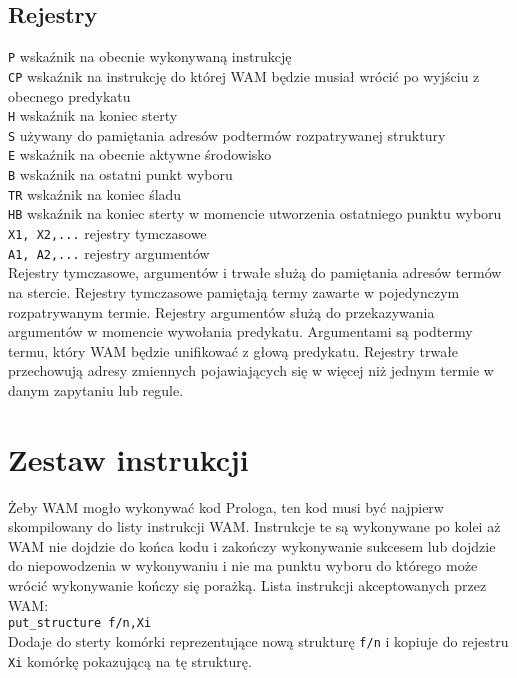 \subsection{Rejestry}
\texttt{P} wskaźnik na obecnie wykonywaną instrukcję\\
\texttt{CP} wskaźnik na instrukcję do której WAM będzie musiał wrócić po wyjściu z obecnego predykatu\\
\texttt{H} wskaźnik na koniec sterty\\
\texttt{S} używany do pamiętania adresów podtermów rozpatrywanej struktury\\
\texttt{E} wskaźnik na obecnie aktywne środowisko\\
\texttt{B} wskaźnik na ostatni punkt wyboru\\
\texttt{TR} wskaźnik na koniec śladu\\
\texttt{HB} wskaźnik na koniec sterty w momencie utworzenia ostatniego punktu wyboru\\
\texttt{X1, X2,...} rejestry tymczasowe\\
\texttt{A1, A2,...} rejestry argumentów\\

Rejestry tymczasowe, argumentów i trwałe służą do pamiętania adresów termów na stercie. Rejestry tymczasowe pamiętają termy zawarte w pojedynczym rozpatrywanym termie. Rejestry argumentów służą do przekazywania argumentów w momencie wywołania predykatu. Argumentami są podtermy termu, który WAM będzie unifikować z głową predykatu. Rejestry trwałe przechowują adresy zmiennych pojawiających się w więcej niż jednym termie w danym zapytaniu lub regule.

\section{Zestaw instrukcji}

Żeby WAM mogło wykonywać kod Prologa, ten kod musi być najpierw skompilowany do listy instrukcji WAM. Instrukcje te są wykonywane po kolei aż WAM nie dojdzie do końca kodu i zakończy wykonywanie sukcesem lub dojdzie do niepowodzenia w wykonywaniu i nie ma punktu wyboru do którego może wrócić wykonywanie kończy się porażką. Lista instrukcji akceptowanych przez WAM\cite{WAM}:\\

\texttt{put\_structure f/n,Xi}\\
Dodaje do sterty komórki reprezentujące nową strukturę \texttt{f/n} i kopiuje do rejestru \texttt{Xi} komórkę pokazującą na tę strukturę.\\

